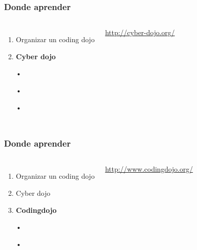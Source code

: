 \documentclass{beamer}
\begin{document}
\begin{frame}
\frametitle{Donde aprender}
\begin{columns}[c] %
\begin{enumerate}
\item Organizar un coding dojo
\item \textbf{Cyber dojo}
\item[•]
\item[•]
\item[•]
\end{enumerate}

{\color{blue}\url{http://cyber-dojo.org/}}
\end{columns}
\end{frame}
\begin{frame}
\frametitle{Donde aprender}
\begin{columns}[c] %
\begin{enumerate}
\item Organizar un coding dojo
\item Cyber dojo
\item \textbf{Codingdojo}
\item[•]
\item[•]
\end{enumerate}

{\color{blue}\url{http://www.codingdojo.org/}}
\end{columns}
\end{frame}
\end{document}
